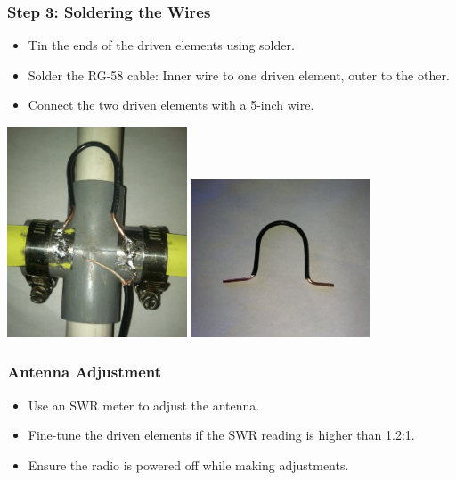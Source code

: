\documentclass{beamer}
\begin{document}
\begin{frame}
    \frametitle{Step 3: Soldering the Wires}
    \begin{itemize}
        \item Tin the ends of the driven elements using solder.
        \item Solder the RG-58 cable: Inner wire to one driven element, outer to the other.
        \item Connect the two driven elements with a 5-inch wire.
    \end{itemize}
    \begin{center}
        \includegraphics[width=0.4\textwidth]{images/soldering-1.jpg}
        \includegraphics[width=0.4\textwidth]{images/soldering-2.jpg}
    \end{center}
\end{frame}

\begin{frame}
    \frametitle{Antenna Adjustment} 
    \begin{itemize}
        \item Use an SWR meter to adjust the antenna.
        \item Fine-tune the driven elements if the SWR reading is higher than 1.2:1.
        \item Ensure the radio is powered off while making adjustments.
    \end{itemize}
\end{frame}
\end{document}
